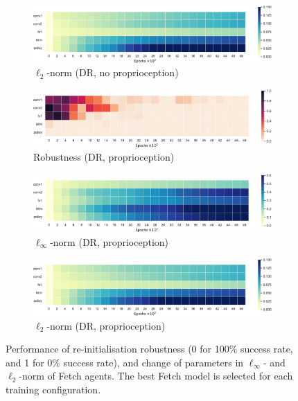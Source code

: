 \begin{figure}[h!]
\begin{subfigure}{0.32\textwidth}
    \includegraphics[width=\textwidth]{figures/chapter6/robustness/fetch/visual_random/l2_dist}
    \caption{$\ell_2$-norm (DR, no proprioception)}
  \end{subfigure}
  \begin{subfigure}{0.32\textwidth}
    \includegraphics[width=\textwidth]{figures/chapter6/robustness/fetch/sensor_random/error}
    \caption{Robustness (DR, proprioception)}
  \end{subfigure}
  \begin{subfigure}{0.32\textwidth}
    \includegraphics[width=\textwidth]{figures/chapter6/robustness/fetch/sensor_random/inf_dist}
    \caption{$\ell_\infty$-norm (DR, proprioception)}
  \end{subfigure}
  \begin{subfigure}{0.32\textwidth}
    \includegraphics[width=\textwidth]{figures/chapter6/robustness/fetch/sensor_random/l2_dist}
    \caption{$\ell_2$-norm (DR, proprioception)}
  \end{subfigure}
  \caption[Test performance of re-initialisation robustness and change of parameters of Fetch agents.]{Performance of re-initialisation robustness (0 for 100$\%$ success rate, and 1 for 0$\%$ success rate), and change of parameters in $\ell_\infty$- and $\ell_2$-norm of Fetch agents. The best Fetch model is selected for each training configuration.}
  \label{fig:fetch_robustness}
\end{figure}
